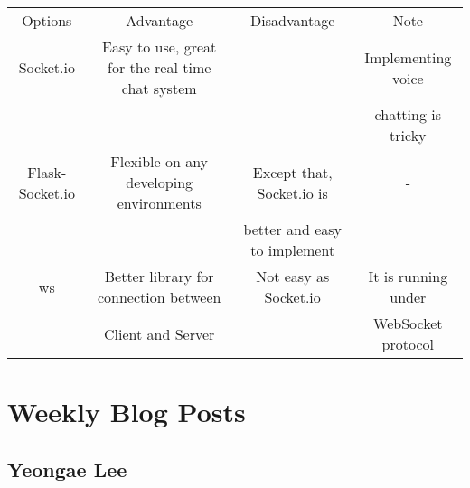\documentclass[10pt]{article}
\begin{document}
                \begin{center}
                \begin{tabular}{ |c|c|c|c| } \hline
                     Options & Advantage & Disadvantage & Note \\
                     Socket.io & Easy to use, great for the real-time chat system & - & Implementing voice \\
                     & & & chatting is tricky\\
                     Flask-Socket.io & Flexible on any developing environments & Except that, Socket.io is& -\\
                     &&better and easy to implement&\\
                     ws & Better library for connection between & Not easy as Socket.io  & It is running under\\
                     &Client and Server& & WebSocket protocol\\
                     \hline
                \end{tabular}
                \end{center}
\newpage
\section{Weekly Blog Posts}
    \subsection{Yeongae Lee}
\end{document}
